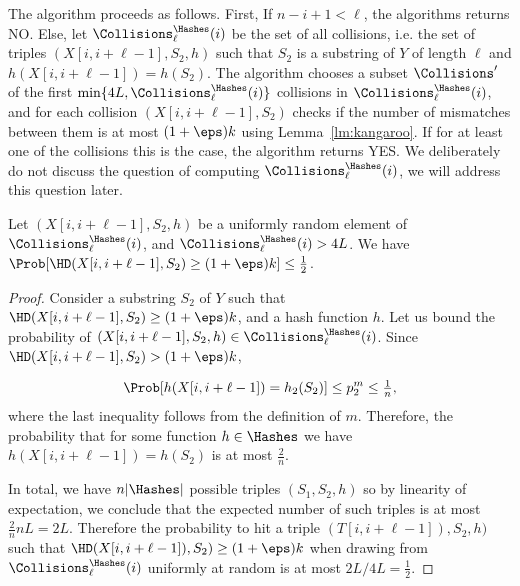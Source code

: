 The algorithm proceeds as follows. First,  If $n-i+1 < \ell$, the algorithms returns NO. Else, let $\Collisions^{\Hashes}_{\ell} (i)$ be the set of all collisions, i.e. the set of triples $(X[i,i+\ell-1], S_2, h)$ such that $S_2$ is a substring of $Y$ of length $\ell$ and $h(X[i,i+\ell-1]) = h(S_2)$. The algorithm chooses a subset $\Collisions'$ of the first $\min\{4L, \Collisions^{\Hashes}_{\ell}(i)\}$ collisions in $\Collisions^{\Hashes}_{\ell}(i)$, and for each collision $(X[i,i+\ell-1], S_2)$ checks if the number of mismatches between them is at most $(1+\eps) k$ using Lemma~\ref{lm:kangaroo}. If for at least one of the collisions this is the case, the algorithm returns YES. We deliberately do not discuss the question of computing $\Collisions^{\Hashes}_{\ell}(i)$, we will address this question later.


\begin{lemma}\label{lm:bad_collisions-kmacs}
Let $(X[i,i+\ell-1],S_2, h)$ be a uniformly random element of $\Collisions^{\Hashes}_{\ell}(i)$, and $\Collisions^{\Hashes}_{\ell}(i) > 4 L$. We have $\Prob[\HD(X[i,i+\ell-1],S_2) \ge (1+\eps) k] \le \frac12$.
\end{lemma}
\begin{proof}
Consider a substring $S_2$ of $Y$ such that $\HD(X[i,i+\ell-1], S_2) \ge (1+\eps)k$, and a hash function $h$. Let us bound the probability of $(X[i,i+\ell-1],S_2, h) \in \Collisions^{\Hashes}_{\ell}(i)$. Since $\HD (X[i,i+\ell-1],S_2)>(1+\eps)k$, 

$$\Prob [h (X[i,i+\ell-1]) = h_2 (S_2)] \le p_2^{m} \le \tfrac{1}{n},$$ 
where the last inequality follows from the definition of $m$. Therefore, the probability that for some function $h \in \Hashes$ we have $h(X[i,i+\ell-1]) = h(S_2)$ is at most $\tfrac{2}{n}$. 

In total, we have $n |\Hashes|$ possible triples $(S_1, S_2 ,h)$ so by linearity of expectation, we conclude that the expected number of such triples is at most $\frac{2}{n} n L =2 L$. Therefore the probability to hit a triple $(T[i,i+\ell-1]), S_2, h)$ such that $\HD(X[i,i+\ell-1]), S_2) \ge (1+\eps)k$ when drawing from $\Collisions^{\Hashes}_{\ell}(i)$ uniformly at random is at most $2L / 4L = \frac12$.
\end{proof}

